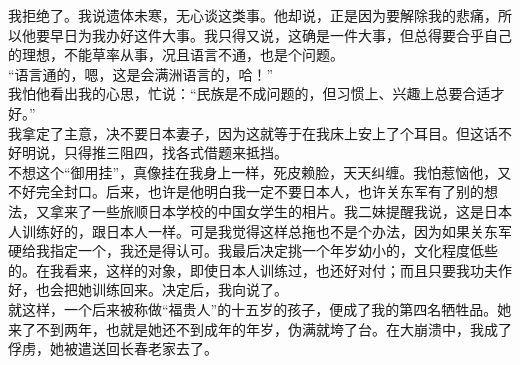 我拒绝了。我说遗体未寒，无心谈这类事。他却说，正是因为要解除我的悲痛，所以他要早日为我办好这件大事。我只得又说，这确是一件大事，但总得要合乎自己的理想，不能草率从事，况且语言不通，也是个问题。\\

“语言通的，嗯，这是会满洲语言的，哈！”\\

我怕他看出我的心思，忙说：“民族是不成问题的，但习惯上、兴趣上总要合适才好。”\\

我拿定了主意，决不要日本妻子，因为这就等于在我床上安上了个耳目。但这话不好明说，只得推三阻四，找各式借题来抵挡。\\

不想这个“御用挂”，真像挂在我身上一样，死皮赖脸，天天纠缠。我怕惹恼他，又不好完全封口。后来，也许是他明白我一定不要日本人，也许关东军有了别的想法，又拿来了一些旅顺日本学校的中国女学生的相片。我二妹提醒我说，这是日本人训练好的，跟日本人一样。可是我觉得这样总拖也不是个办法，因为如果关东军硬给我指定一个，我还是得认可。我最后决定挑一个年岁幼小的，文化程度低些的。在我看来，这样的对象，即使日本人训练过，也还好对付；而且只要我功夫作好，也会把她训练回来。决定后，我向说了。\\

就这样，一个后来被称做“福贵人”的十五岁的孩子，便成了我的第四名牺牲品。她来了不到两年，也就是她还不到成年的年岁，伪满就垮了台。在大崩溃中，我成了俘虏，她被遣送回长春老家去了。
